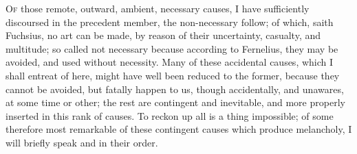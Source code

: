 {{\lettrine{O}{f} those remote, outward, ambient, necessary causes, I have
sufficiently discoursed in the precedent member, the non-necessary
follow; of which, saith Fuchsius, no art can be made, by reason
of their uncertainty, casualty, and multitude; so called not necessary
because according to Fernelius, they may be avoided, and used
without necessity. Many of these accidental causes, which I shall
entreat of here, might have well been reduced to the former, because
they cannot be avoided, but fatally happen to us, though accidentally,
and unawares, at some time or other; the rest are contingent and
inevitable, and more properly inserted in this rank of causes. To
reckon up all is a thing impossible; of some therefore most remarkable
of these contingent causes which produce melancholy, I will briefly
speak and in their order.

}}
